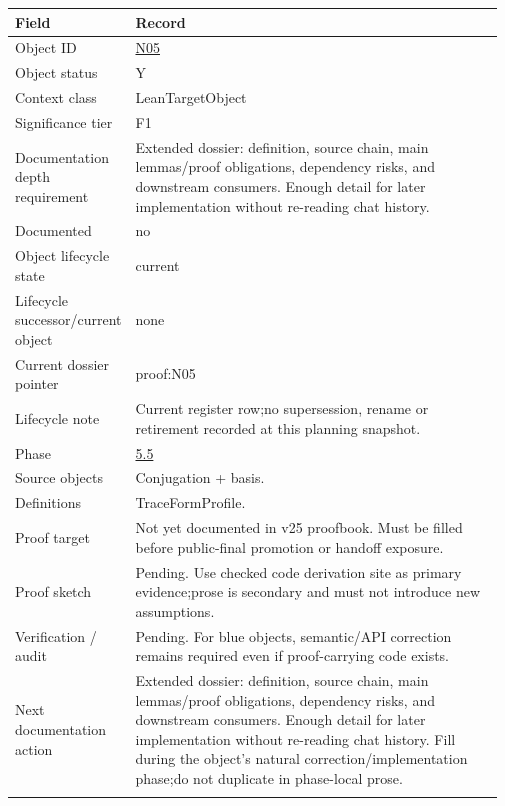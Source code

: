 \begin{longtable}{L{0.16\linewidth} L{0.81\linewidth}}
\hline
\textbf{Field} & \textbf{Record}\\
\hline
Object ID & \hyperlink{object-row-N05}{N05}\\
\hline\addlinespace[0.20em]
Object status & Y\\
\hline\addlinespace[0.20em]
Context class & LeanTargetObject\\
\hline\addlinespace[0.20em]
Significance tier & F1\\
\hline\addlinespace[0.20em]
Documentation depth requirement & Extended dossier: definition, source chain, main lemmas/\allowbreak{}proof obligations, dependency risks, and downstream consumers. Enough detail for later implementation without re-reading chat history.\\
\hline\addlinespace[0.20em]
Documented & no\\
\hline\addlinespace[0.20em]
Object lifecycle state & current\\
\hline\addlinespace[0.20em]
Lifecycle successor/\allowbreak{}current object & none\\
\hline\addlinespace[0.20em]
Current dossier pointer & proof:N05\\
\hline\addlinespace[0.20em]
Lifecycle note & Current register row;\newline no supersession, rename or retirement recorded at this planning snapshot.\\
\hline\addlinespace[0.20em]
Phase & \hyperlink{phase-row-5-5}{5.5}\\
\hline\addlinespace[0.20em]
Source objects & Conjugation + basis.\\
\hline\addlinespace[0.20em]
Definitions & TraceFormProfile.\\
\hline\addlinespace[0.20em]
Proof target & Not yet documented in v25 proofbook. Must be filled before public-final promotion or handoff exposure.\\
\hline\addlinespace[0.20em]
Proof sketch & Pending. Use checked code derivation site as primary evidence;\newline prose is secondary and must not introduce new assumptions.\\
\hline\addlinespace[0.20em]
Verification /\allowbreak{} audit & Pending. For blue objects, semantic/\allowbreak{}API correction remains required even if proof-carrying code exists.\\
\hline\addlinespace[0.20em]
Next documentation action & Extended dossier: definition, source chain, main lemmas/\allowbreak{}proof obligations, dependency risks, and downstream consumers. Enough detail for later implementation without re-reading chat history. Fill during the object's natural correction/\allowbreak{}implementation phase;\newline do not duplicate in phase-local prose.\\
\hline\addlinespace[0.20em]
\end{longtable}
